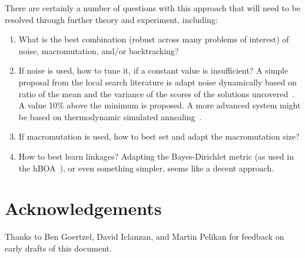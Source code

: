 \documentclass[letterpaper]{article}
\begin{document}
There are certainly a number of questions with this approach that will need to
be resolved through further theory and experiment, including:
\begin{enumerate}
\item What is the best combination (robust across many problems of interest) of
  noise, macromutation, and/or backtracking?
\item If noise is used, how to tune it, if a constant value is insufficient? A
  simple proposal from the local search literature is adapt noise dynamically
  based on ratio of the mean and the variance of the scores of the solutions
  uncovered~\cite{ls_invariants}. A value 10\% above the minimum is proposed. A
  more advanced system might be based on thermodynamic simulated
  annealing~\cite{tsa}.
\item If macromutation is used, how to best set and adapt the macromutation
  size?
\item How to best learn linkages? Adapting the Bayes-Dirichlet metric (as used
  in the hBOA~\cite{hBOA}), or even something simpler, seems like a decent
  approach.
\end{enumerate}

\section{Acknowledgements}

Thanks to Ben Goertzel, David Iclanzan, and Martin Pelikan for feedback on
early drafts of this document.



\end{document}
